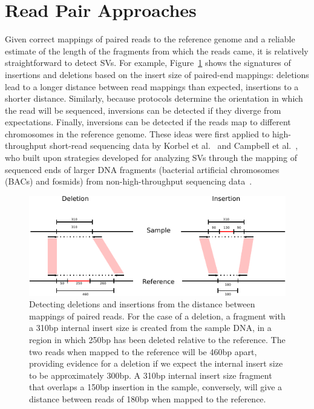 \section{Read Pair Approaches}\label{section_read_pair}

Given correct mappings of paired reads to the reference genome and a reliable estimate of the length of the fragments from which the reads came, it is relatively straightforward to detect SVs. For example, Figure~\ref{rp_signatures} shows the signatures of insertions and deletions based on the insert size of paired-end mappings: deletions lead to a longer distance between read mappings than expected, insertions to a shorter distance. Similarly, because protocols determine the orientation in which the read will be sequenced, inversions can be detected if they diverge from expectations. Finally, inversions can be detected if the reads map to different chromosomes in the reference genome. These ideas were first applied to high-throughput short-read sequencing data by Korbel et al.~\cite{Korbel:2007p544} and Campbell et al.~\cite{Campbell:2008p539}, who built upon strategies developed for analyzing SVs through the mapping of sequenced ends of larger DNA fragments (bacterial artificial chromosomes (BACs) and fosmids) from non-high-throughput sequencing data~\cite{Volik:2003fh,Raphael:2003ug,Tuzun:2005bp}.

\begin{figure}
\centering
\includegraphics[width=\textwidth]{figures/rp_signatures.pdf}
\caption[Detecting deletions and insertions from the distance between mappings of paired reads.]{Detecting deletions and insertions from the distance between mappings of paired reads. For the case of a deletion, a fragment with a 310bp internal insert size is created from the sample DNA, in a region in which 250bp has been deleted relative to the reference. The two reads when mapped to the reference will be 460bp apart, providing evidence for a deletion if we expect the internal insert size to be approximately 300bp. A 310bp internal insert size fragment that overlaps a 150bp insertion in the sample, conversely, will give a distance between reads of 180bp when mapped to the reference.}
\label{rp_signatures}
\end{figure}

